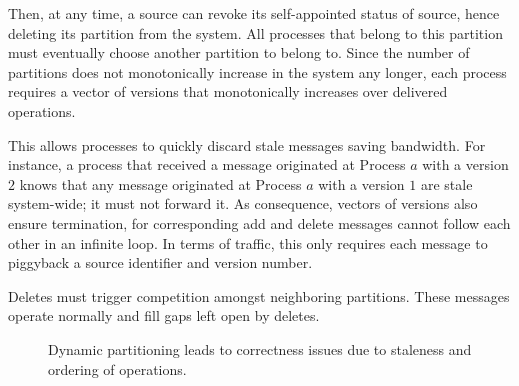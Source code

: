 Then, at any time, a source can revoke its self-appointed status of
source, hence deleting its partition from the system. All processes
that belong to this partition must eventually choose another partition
to belong to. Since the number of partitions does not monotonically
increase in the system any longer, each process requires a vector of
versions that monotonically increases over delivered operations.

This allows processes to quickly discard stale messages saving
bandwidth. For instance, a process that received a message originated
at Process $a$ with a version $2$ knows that any message originated at
Process $a$ with a version $1$ are stale system-wide; it must not
forward it. As consequence, vectors of versions also ensure
termination, for corresponding add and delete messages cannot follow
each other in an infinite loop. In terms of traffic, this only
requires each  message to piggyback a source identifier
and version number.


\noindent Deletes must trigger competition amongst neighboring
partitions. These  messages operate normally and fill gaps
left open by deletes.

\begin{figure*}
  \begin{center}
    \hspace{10pt}
    \caption{\label{fig:proof}Dynamic partitioning leads to correctness issues due to
      staleness and ordering of operations.}
  \end{center}
\end{figure*}

